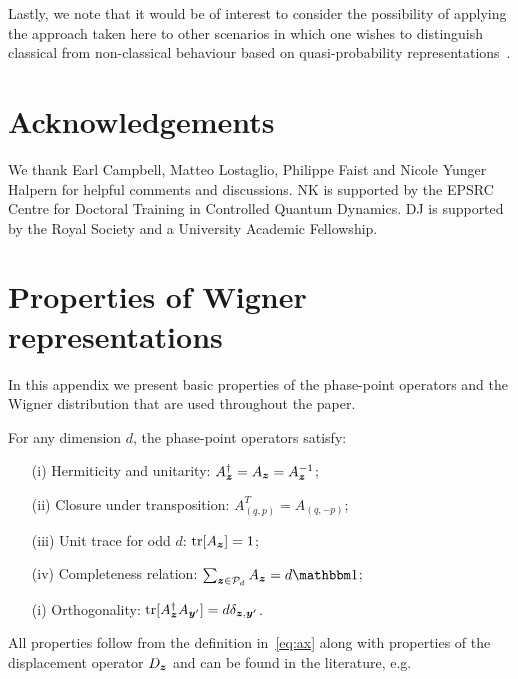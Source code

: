 \documentclass[pra,
aps,
twocolumn,
superscriptaddress,
groupedaddress,
nofootinbib,
reprint
]{revtex4-1}
\begin{document}
Lastly, we note that it would be of interest to consider the possibility of applying the approach taken here to other scenarios in which one wishes to distinguish classical from non-classical behaviour based on quasi-probability representations~\cite{Ferrie_2008, barnett_1997,Allahverdyan_2018, arvidsson_2020, halpern_2018, Lostaglio_2018, Levy_2020}.

\vspace{1cm}
\section{Acknowledgements}
We thank Earl Campbell, Matteo Lostaglio, Philippe Faist and Nicole Yunger Halpern for helpful comments and discussions. NK is supported by the EPSRC Centre for Doctoral Training in Controlled Quantum Dynamics. DJ is supported by the Royal Society and a University Academic Fellowship.
	


%


\appendix
\newpage
\section{Properties of Wigner representations}
\label{app:wigner}

In this appendix we present basic properties of the phase-point operators and the Wigner distribution that are used throughout the paper.

\begin{proposition}\label{thm:aproperties}
    For any dimension $d$, the phase-point operators satisfy:
    \begin{enumerate}
        \item[(i)]\label{en:a1} Hermiticity and unitarity: $A_{\bm{z}}^\dagger = A_{\bm{z}} = A_{\bm{z}}^{-1}$;
	    \item[(ii)]\label{en:a2} Closure under transposition: $A_{(q, p)}^T = A_{(q, -p)}$;
	    \item[(iii)]\label{en:a3} Unit trace for odd $d$: $\mbox{tr}[A_{\bm{z}}] = 1$;
	    \item[(iv)]\label{en:a4} Completeness relation: $\sum_{\bmz \in \cal{P}_d} A_{\bmz} = d\id$;
	    \item[(i)]\label{en:a5} Orthogonality: $\mbox{tr}[A_{\bm{z}}^\dagger A_{\bm{y}'}] = d \delta_{\bm{z},\bm{y}'}$.
	\end{enumerate}
\end{proposition}
All properties follow from the definition in~\cref{eq:ax} along with properties of the displacement operator $D_{\bm{z}}$ and can be found in the literature, e.g.~\cite{cit:veitch,Vourdas_2004,cit:gross3}
\end{document}
